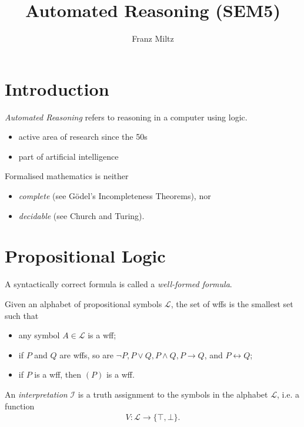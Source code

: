 \documentclass{article}
\title{Automated Reasoning (SEM5)}
\author{Franz Miltz}
\begin{document}
\maketitle
\tableofcontents
\pagebreak
\section{Introduction}
\begin{definition}
	\emph{Automated Reasoning} refers to reasoning in a computer using logic.
	\begin{itemize}
		\item active area of research since the 50s
		\item part of artificial intelligence
	\end{itemize}
\end{definition}
\begin{theorem}
	Formalised mathematics is neither
	\begin{itemize}
		\item \emph{complete} (see G\"odel's Incompleteness Theorems), nor
		\item \emph{decidable} (see Church and Turing).
	\end{itemize}
\end{theorem}

\section{Propositional Logic}

\begin{definition}
	A syntactically correct formula is called a \emph{well-formed formula}.

	Given an alphabet of propositional symbols $\mathcal{L}$, the
	set of wffs is the smallest set such that
	\begin{itemize}
		\item any symbol $A\in\mathcal{L}$ is a wff;
		\item if $P$ and $Q$ are wffs, so are $\neg P, P\vee Q, P\wedge Q, P\rightarrow Q$, and $P\leftrightarrow Q$;
		\item if $P$ is a wff, then $(P)$ is a wff.
	\end{itemize}
\end{definition}

\begin{definition}
	An \emph{interpretation} $\mathcal{I}$ is a truth assignment
	to the symbols in the alphabet $\mathcal{L}$, i.e. a function
	\begin{align*}
		V:\mathcal{L}\to \{\top,\bot\}.
	\end{align*}
\end{definition}
\end{document}
